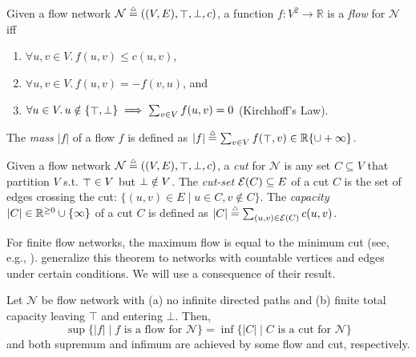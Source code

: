 \documentclass{lmcs}
\begin{document}
\begin{defi}[Flow]
  Given a flow network $\mathcal{N} \mathrel{\stackrel{\scriptscriptstyle \triangle}{=}} ((V, E), \mathop{\top}, \mathop{\perp}, c)$,
  a function $f : V^2 \to \mathbb{R}$ is a \emph{flow} for $\mathcal{N}$
  iff
  \begin{enumerate} \setlength{\itemsep}{0pt}
  \item $\forall u, v \in V .\, f(u, v) \leq c(u, v)$,
  \item $\forall u, v \in V .\, f(u, v) = -f(v, u)$, and
  \item $\forall u \in V .\, u \notin \{ \mathop{\top}, \mathop{\perp} \} \implies
           \sum_{v \in V} f(u, v) = 0$
        (Kirchhoff's Law).
  \end{enumerate}
  The \emph{mass} $|f|$ of a flow $f$ is defined as
  $|f| \mathrel{\stackrel{\scriptscriptstyle \triangle}{=}} \sum_{v \in V} f(\mathop{\top}, v) \in \mathbb{R} \{\cup +\infty\}$.
\end{defi}

\begin{defi}[Cut]
  Given a flow network $\mathcal{N} \mathrel{\stackrel{\scriptscriptstyle \triangle}{=}} ((V, E), \mathop{\top}, \mathop{\perp}, c)$,
  a \emph{cut} for $\mathcal{N}$ is any set $C \subseteq V$ that
  partition $V$ s.t. $\mathop{\top} \in V$ but $\mathop{\perp} \notin V$.  The
  \emph{cut-set} $\mathcal{E}(C) \subseteq E$ of a cut $C$ is the set of edges
  crossing the cut:
  $\{ (u, v) \in E \mid u \in C, v \notin C \}$.
  The \emph{capacity} $|C| \in \mathbb{R}^{\geq 0} \cup \{\infty\}$ of a cut $C$ is defined as
  $|C| \mathrel{\stackrel{\scriptscriptstyle \triangle}{=}} \sum_{(u, v) \in \mathcal{E}(C)} c(u, v)$.
\end{defi}

For finite flow networks, the maximum flow is equal to the minimum cut (see,
e.g., \citet{Kleinberg:2005:AD:1051910}).
\citet{DBLP:journals/jct/AharoniBGPS11} generalize this theorem to networks with
countable vertices and edges under certain conditions. We will use a consequence
of their result.

\begin{thm}
  \label{t:maxflow}
  Let $\mathcal{N}$ be flow network with (a) no infinite directed paths and (b)
  finite total capacity leaving $\top$ and entering $\bot$. Then,
  \[ \sup \{ |f| \mid \text{$f$ is a flow for $\mathcal{N}$} \} =
     \inf \{ |C| \mid \text{$C$ is a cut for $\mathcal{N}$} \} \]
  and both supremum and infimum are achieved by some flow and cut, respectively.
\end{thm}
\end{document}
